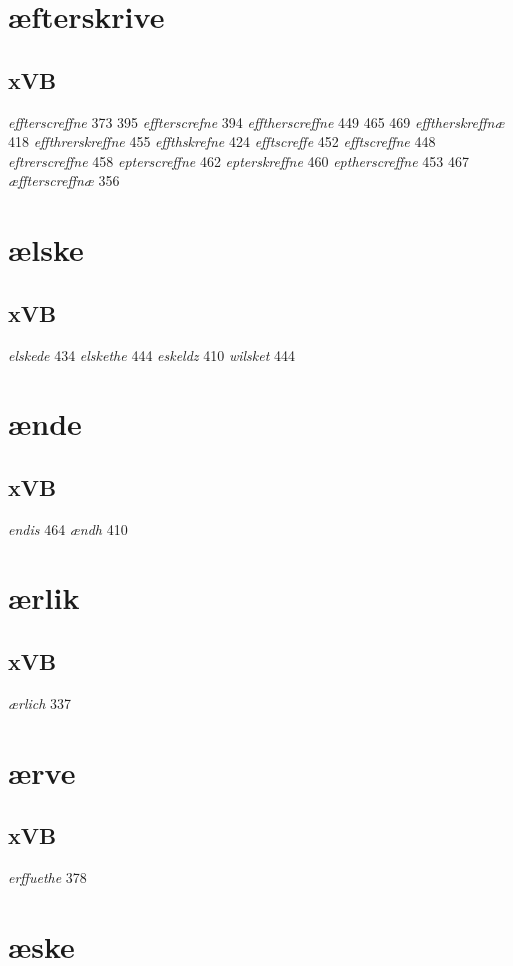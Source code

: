 \documentclass[a4paper,twocolumn]{article}
\begin{document}
\section{æfterskrive}
\label{sec:org27fe25f}
\subsection{xVB}
\label{sec:orgb7cc61e}
\emph{effterscreffne} 373 395 \emph{effterscrefne} 394 \emph{efftherscreffne} 449 465 469 \emph{efftherskreffnæ} 418 \emph{effthrerskreffne} 455 \emph{effthskrefne} 424 \emph{efftscreffe} 452 \emph{efftscreffne} 448 \emph{eftrerscreffne} 458 \emph{epterscreffne} 462 \emph{epterskreffne} 460 \emph{eptherscreffne} 453 467 \emph{æffterscreffnæ} 356 
\section{ælske}
\label{sec:org40e142b}
\subsection{xVB}
\label{sec:orgec918d6}
\emph{elskede} 434 \emph{elskethe} 444 \emph{eskeldz} 410 \emph{wilsket} 444 
\section{ænde}
\label{sec:orga9ed209}
\subsection{xVB}
\label{sec:org7137b87}
\emph{endis} 464 \emph{ændh} 410 
\section{ærlik}
\label{sec:org8d0b2e8}
\subsection{xVB}
\label{sec:orge466c58}
\emph{ærlich} 337 
\section{ærve}
\label{sec:orge6d1204}
\subsection{xVB}
\label{sec:org71d8bf2}
\emph{erffuethe} 378 
\section{æske}
\label{sec:org04144b1}
\end{document}
